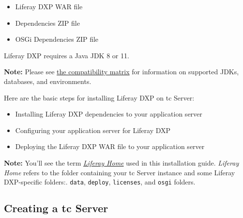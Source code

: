 \begin{itemize}
\tightlist
\item
  Liferay DXP WAR file
\item
  Dependencies ZIP file
\item
  OSGi Dependencies ZIP file
\end{itemize}

Liferay DXP requires a Java JDK 8 or 11.

\noindent\hrulefill

\textbf{Note:} Please see
\href{https://www.liferay.com/documents/10182/246659966/Liferay+DXP+7.1+Compatibility+Matrix.pdf/c8805b72-c693-1f26-3f2d-731ffc301366}{the
compatibility matrix} for information on supported JDKs, databases, and
environments.

\noindent\hrulefill

Here are the basic steps for installing Liferay DXP on tc Server:

\begin{itemize}
\item
  Installing Liferay DXP dependencies to your application server
\item
  Configuring your application server for Liferay DXP
\item
  Deploying the Liferay DXP WAR file to your application server
\end{itemize}

\noindent\hrulefill

\textbf{Note:} You'll see the term
\href{/docs/7-1/deploy/-/knowledge_base/d/installing-liferay\#liferay-home}{\emph{Liferay
Home}} used in this installation guide. \emph{Liferay Home} refers to
the folder containing your tc Server instance and some Liferay
DXP-specific folders:. \texttt{data}, \texttt{deploy},
\texttt{licenses}, and \texttt{osgi} folders.

\noindent\hrulefill

\subsection{Creating a tc Server}\label{creating-a-tc-server}

